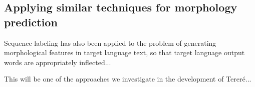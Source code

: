 \subsection{Applying similar techniques for morphology prediction}

Sequence labeling has also been applied to the problem of generating
morphological features in target language text, so that target language output
words are appropriately inflected...
\cite{toutanova-suzuki-ruopp:2008:ACLMain}

This will be one of the approaches we investigate in the development of
Tereré...

